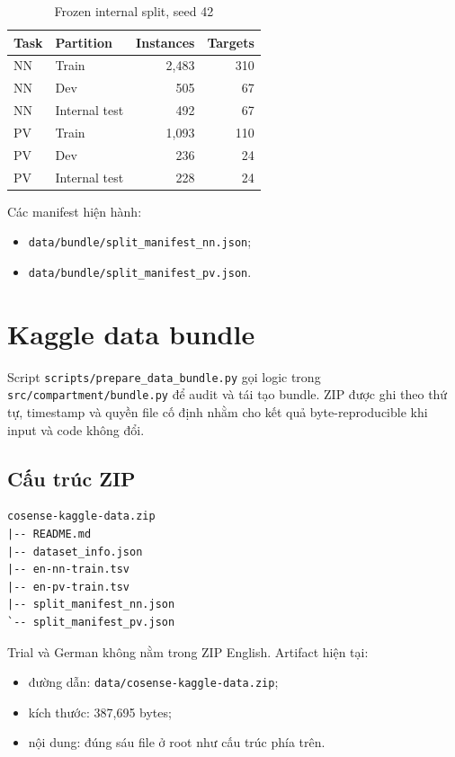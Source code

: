 \documentclass[11pt,a4paper]{article}
\newcommand{\code}[1]{\nolinkurl{#1}}
\begin{document}
\begin{table}[htbp]
\centering
\caption{Frozen internal split, seed 42}
\begin{tabular}{@{}llrr@{}}
\toprule
Task & Partition & Instances & Targets \\
\midrule
NN & Train & 2,483 & 310 \\
NN & Dev & 505 & 67 \\
NN & Internal test & 492 & 67 \\
\midrule
PV & Train & 1,093 & 110 \\
PV & Dev & 236 & 24 \\
PV & Internal test & 228 & 24 \\
\bottomrule
\end{tabular}
\end{table}

Các manifest hiện hành:
\begin{itemize}
  \item \code{data/bundle/split_manifest_nn.json};
  \item \code{data/bundle/split_manifest_pv.json}.
\end{itemize}

\section{Kaggle data bundle}

Script \code{scripts/prepare_data_bundle.py} gọi logic trong \code{src/compartment/bundle.py} để audit và tái tạo bundle. ZIP được ghi theo thứ tự, timestamp và quyền file cố định nhằm cho kết quả byte-reproducible khi input và code không đổi.

\subsection{Cấu trúc ZIP}

\begin{verbatim}
cosense-kaggle-data.zip
|-- README.md
|-- dataset_info.json
|-- en-nn-train.tsv
|-- en-pv-train.tsv
|-- split_manifest_nn.json
`-- split_manifest_pv.json
\end{verbatim}

Trial và German không nằm trong ZIP English. Artifact hiện tại:
\begin{itemize}
  \item đường dẫn: \code{data/cosense-kaggle-data.zip};
  \item kích thước: 387,695 bytes;
  \item nội dung: đúng sáu file ở root như cấu trúc phía trên.
\end{itemize}
\end{document}
